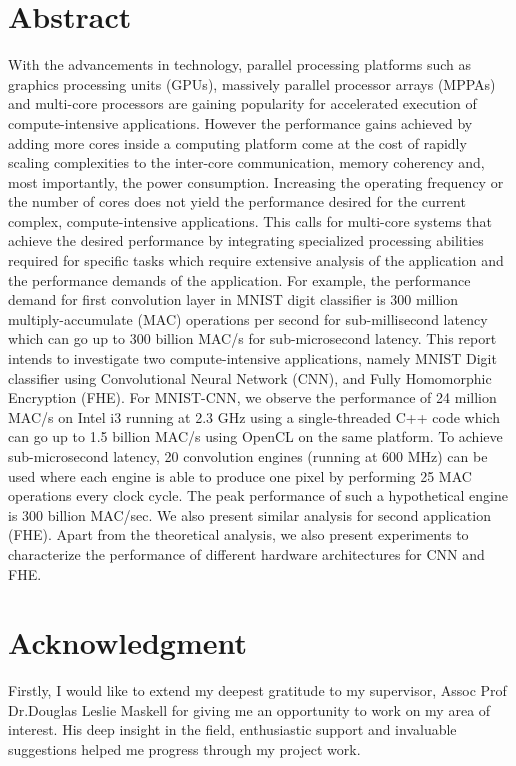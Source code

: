 \chapter*{Abstract} 
\label{ch0i_Abstract}
\quad With the advancements in technology, parallel processing platforms such as graphics processing units (GPUs), massively parallel processor arrays (MPPAs) and multi-core processors are gaining popularity for accelerated execution of compute-intensive applications. However the performance gains achieved by adding more cores inside a computing platform come at the cost of rapidly scaling complexities to the inter-core communication, memory coherency and, most importantly, the power consumption. Increasing the operating frequency or the number of cores does not yield the performance desired for the current complex, compute-intensive applications. This calls for multi-core systems that achieve the desired performance by integrating specialized processing abilities required for specific tasks which require extensive analysis of the application and the performance demands of the application. For example, the performance demand for first convolution layer in MNIST digit classifier is 300 million multiply-accumulate (MAC) operations per second for sub-millisecond latency which can go up to 300 billion MAC/s for sub-microsecond latency. 
\newline This report intends to investigate two compute-intensive applications, namely MNIST Digit classifier using Convolutional Neural Network (CNN), and Fully Homomorphic Encryption (FHE). For MNIST-CNN, we observe the performance of 24 million MAC/s on Intel i3 running at 2.3 GHz using a single-threaded C++ code which can go up to 1.5 billion MAC/s using OpenCL on the same platform. To achieve sub-microsecond latency, 20 convolution engines (running at 600 MHz) can be used where each engine is able to produce one pixel by performing 25 MAC operations every clock cycle. The peak performance of such a hypothetical engine is 300 billion MAC/sec. We also present similar analysis for second application (FHE). Apart from the theoretical analysis, we also present experiments to characterize the performance of different hardware architectures for CNN and FHE.

\chapter*{Acknowledgment} 
\label{ch0ii_Acknowledgement}

\quad Firstly, I would like to extend my deepest gratitude to my supervisor, Assoc Prof Dr.Douglas Leslie Maskell for giving me an opportunity to work on my area of interest. His deep insight in the field, enthusiastic support and invaluable suggestions helped me progress through my project work. \newline

